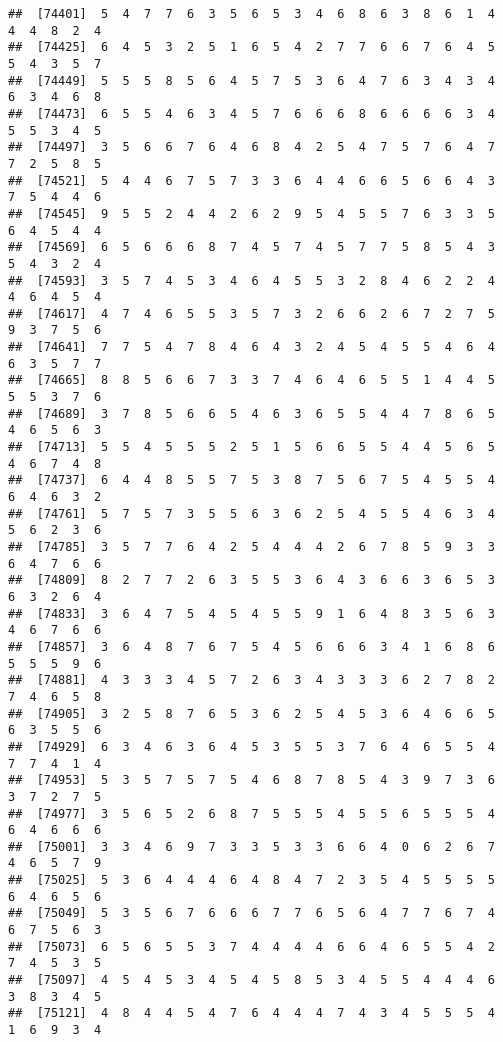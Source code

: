 \documentclass[
]{book}
\begin{document}
\begin{verbatim}
##  [74401]  5  4  7  7  6  3  5  6  5  3  4  6  8  6  3  8  6  1  4  4  4  8  2  4
##  [74425]  6  4  5  3  2  5  1  6  5  4  2  7  7  6  6  7  6  4  5  5  4  3  5  7
##  [74449]  5  5  5  8  5  6  4  5  7  5  3  6  4  7  6  3  4  3  4  6  3  4  6  8
##  [74473]  6  5  5  4  6  3  4  5  7  6  6  6  8  6  6  6  6  3  4  5  5  3  4  5
##  [74497]  3  5  6  6  7  6  4  6  8  4  2  5  4  7  5  7  6  4  7  7  2  5  8  5
##  [74521]  5  4  4  6  7  5  7  3  3  6  4  4  6  6  5  6  6  4  3  7  5  4  4  6
##  [74545]  9  5  5  2  4  4  2  6  2  9  5  4  5  5  7  6  3  3  5  6  4  5  4  4
##  [74569]  6  5  6  6  6  8  7  4  5  7  4  5  7  7  5  8  5  4  3  5  4  3  2  4
##  [74593]  3  5  7  4  5  3  4  6  4  5  5  3  2  8  4  6  2  2  4  4  6  4  5  4
##  [74617]  4  7  4  6  5  5  3  5  7  3  2  6  6  2  6  7  2  7  5  9  3  7  5  6
##  [74641]  7  7  5  4  7  8  4  6  4  3  2  4  5  4  5  5  4  6  4  6  3  5  7  7
##  [74665]  8  8  5  6  6  7  3  3  7  4  6  4  6  5  5  1  4  4  5  5  5  3  7  6
##  [74689]  3  7  8  5  6  6  5  4  6  3  6  5  5  4  4  7  8  6  5  4  6  5  6  3
##  [74713]  5  5  4  5  5  5  2  5  1  5  6  6  5  5  4  4  5  6  5  4  6  7  4  8
##  [74737]  6  4  4  8  5  5  7  5  3  8  7  5  6  7  5  4  5  5  4  6  4  6  3  2
##  [74761]  5  7  5  7  3  5  5  6  3  6  2  5  4  5  5  4  6  3  4  5  6  2  3  6
##  [74785]  3  5  7  7  6  4  2  5  4  4  4  2  6  7  8  5  9  3  3  6  4  7  6  6
##  [74809]  8  2  7  7  2  6  3  5  5  3  6  4  3  6  6  3  6  5  3  6  3  2  6  4
##  [74833]  3  6  4  7  5  4  5  4  5  5  9  1  6  4  8  3  5  6  3  4  6  7  6  6
##  [74857]  3  6  4  8  7  6  7  5  4  5  6  6  6  3  4  1  6  8  6  5  5  5  9  6
##  [74881]  4  3  3  3  4  5  7  2  6  3  4  3  3  3  6  2  7  8  2  7  4  6  5  8
##  [74905]  3  2  5  8  7  6  5  3  6  2  5  4  5  3  6  4  6  6  5  6  3  5  5  6
##  [74929]  6  3  4  6  3  6  4  5  3  5  5  3  7  6  4  6  5  5  4  7  7  4  1  4
##  [74953]  5  3  5  7  5  7  5  4  6  8  7  8  5  4  3  9  7  3  6  3  7  2  7  5
##  [74977]  3  5  6  5  2  6  8  7  5  5  5  4  5  5  6  5  5  5  4  6  4  6  6  6
##  [75001]  3  3  4  6  9  7  3  3  5  3  3  6  6  4  0  6  2  6  7  4  6  5  7  9
##  [75025]  5  3  6  4  4  4  6  4  8  4  7  2  3  5  4  5  5  5  5  6  4  6  5  6
##  [75049]  5  3  5  6  7  6  6  6  7  7  6  5  6  4  7  7  6  7  4  6  7  5  6  3
##  [75073]  6  5  6  5  5  3  7  4  4  4  4  6  6  4  6  5  5  4  2  7  4  5  3  5
##  [75097]  4  5  4  5  3  4  5  4  5  8  5  3  4  5  5  4  4  4  6  3  8  3  4  5
##  [75121]  4  8  4  4  5  4  7  6  4  4  4  7  4  3  4  5  5  5  4  1  6  9  3  4

\end{verbatim}
\end{document}
